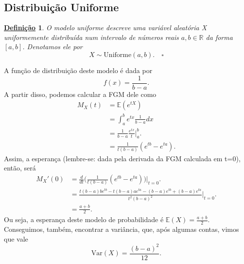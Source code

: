 \documentclass{article}
\newtheorem*{def*}{\underline{Defini\c c\~ao}}
\begin{document}
\subsection{Distribuição Uniforme}
\begin{def*}
  O \textit{modelo uniforme} descreve uma variável aleatória X uniformemente distribuída num intervalo de números reais \(a, b\in \mathbb{R}\) da
  forma \([a, b]\). Denotamos ele por 
  \[
    X\sim \mathrm{Uniforme}(a, b).\quad\square
  \]
\end{def*}
A função de distribuição deste modelo é dada por 
\[
  f(x) = \frac{1}{b-a}.
\]
A partir disso, podemos calcular a FGM dele como
\begin{align*}
  M_{X}(t) &= \mathbb{E}(e^{tX})\\
           &= \int_{a}^{b}e^{tx}\frac{1}{b-a}dx\\
           &= \frac{1}{b-a}\frac{e^{tx}}{t}\biggl|_{a}^{b}\biggr.\\
           &= \frac{1}{t(b-a)}(e^{tb} - e^{ta}).
\end{align*}
Assim, a esperança (lembre-se: dada pela derivada da FGM calculada em t=0), então, será
\begin{align*}
  M_{X}'(0) &= \frac{d}{dt}\biggl(\frac{1}{t(b-a)}(e^{tb}-e^{ta})\biggr)\biggl|_{t=0}^{}\biggr. \\
            &= \frac{t(b-a)be^{tb}-t(b-a)ae^{ta} - (b-a)e^{tb}+(b-a)e^{ta}}{t^{2}(b-a)^{2}}\biggl|_{t=0}^{}\biggr.\\
            &= \frac{a + b}{2}.
\end{align*}
Ou seja, a esperança deste modelo de probabilidade é \(\mathbb{E}(X) = \frac{a + b}{2}.\) Conseguimos, também,
encontrar a variância, que, após algumas contas, vimos que vale 
\[
  \mathrm{Var}(X) = \frac{(b-a)^{2}}{12}.
\]
\end{document}
